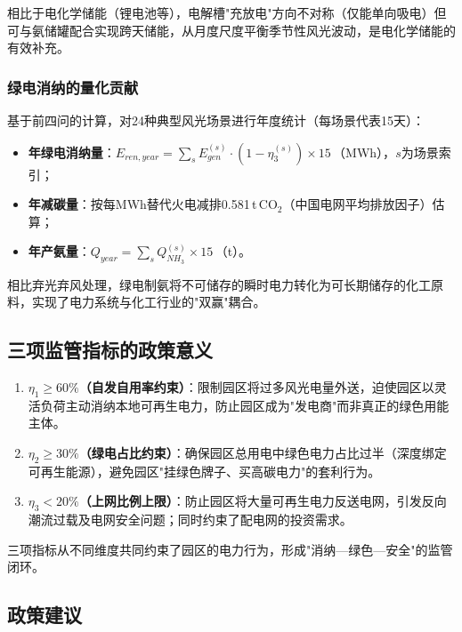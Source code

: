 \documentclass[UTF8,12pt,a4paper]{ctexart}
\begin{document}
相比于电化学储能（锂电池等），电解槽"充放电"方向不对称（仅能单向吸电）但可与氨储罐配合实现跨天储能，从月度尺度平衡季节性风光波动，是电化学储能的有效补充。

\subsubsection{绿电消纳的量化贡献}

基于前四问的计算，对24种典型风光场景进行年度统计（每场景代表15天）：

\begin{itemize}[leftmargin=3em, itemsep=0.2em]
  \item \textbf{年绿电消纳量}：$E_{ren,year} = \sum_s E_{gen}^{(s)}\cdot(1-\eta_3^{(s)})\times 15$\,（MWh），$s$为场景索引；
  \item \textbf{年减碳量}：按每MWh替代火电减排0.581\,t\,CO$_2$（中国电网平均排放因子）估算；
  \item \textbf{年产氨量}：$Q_{year}=\sum_s Q_{NH_3}^{(s)}\times 15$\,（t）。
\end{itemize}

相比弃光弃风处理，绿电制氨将不可储存的瞬时电力转化为可长期储存的化工原料，实现了电力系统与化工行业的"双赢"耦合。

\subsection{三项监管指标的政策意义}

\begin{enumerate}[leftmargin=3em, itemsep=0.3em]
  \item \textbf{$\eta_1\geq60\%$（自发自用率约束）}：限制园区将过多风光电量外送，迫使园区以灵活负荷主动消纳本地可再生电力，防止园区成为"发电商"而非真正的绿色用能主体。
  \item \textbf{$\eta_2\geq30\%$（绿电占比约束）}：确保园区总用电中绿色电力占比过半（深度绑定可再生能源），避免园区"挂绿色牌子、买高碳电力"的套利行为。
  \item \textbf{$\eta_3<20\%$（上网比例上限）}：防止园区将大量可再生电力反送电网，引发反向潮流过载及电网安全问题；同时约束了配电网的投资需求。
\end{enumerate}

三项指标从不同维度共同约束了园区的电力行为，形成"消纳—绿色—安全"的监管闭环。

\subsection{政策建议}
\end{document}
